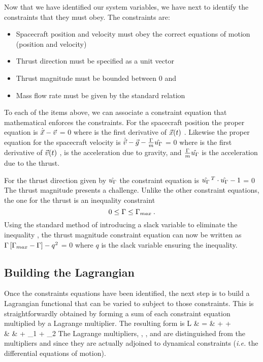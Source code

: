 \documentclass{article}
\newcommand{\scpos}{\ensuremath{\idx{\cv{x}}{(t)}} }
\newcommand{\scvel}{\ensuremath{\idx{\cv{v}}{(t)}} }
\newcommand{\tvec} {\ensuremath{\cuv{\idx{u}{\dn{\gG}}}} }
\newcommand{\tvect}{\ensuremath{\ruv{\idx{u}{\dn{\gG}}}} }
\newcommand{\lx} {\idx{\cv{\gl}}{\dn{x}} }
\newcommand{\lxt}{\idx{\cv{\gl}}{\dn{x}\up{T}} }
\newcommand{\lv} {\idx{\cv{\gl}}{\dn{v}} }
\newcommand{\lvt}{\idx{\cv{\gl}}{\dn{v}\up{T}} }
\newcommand{\lm} {\idx{\gl}{\dn{m}} }
\newcommand{\poseq}{\ensuremath{\dt{\cv{x}} - \cv{v}} }
\newcommand{\veleq}{\ensuremath{\dt{\cv{v}} - \cv{g} -
                                       \frac{\gG}{m}\cuv{\idx{u}{\dn{\gG}}}} }
\newcommand{\meq}{\ensuremath{\dt{m} - \frac{\gG}{c}} }
\newcommand{\veceq}{\ensuremath{\ipd{\tvect}{\tvec} - 1} }
\newcommand{\teq}  {\ensuremath{\gG \surb{\idx{\gG}{\dn{max}} - \gG} - \idx{q}{\up{2}}} }
\begin{document}
Now that we have identified our system variables, we have next to
identify the constraints that they must obey.  The constraints
are:
\begin{itemize}
  \item Spacecraft position and velocity must obey the correct equations of motion
  (position and velocity)
  \item Thrust direction must be specified as a unit vector
  \item Thrust magnitude must be bounded between 0 and
  \item Mass flow rate must be given by the standard relation
\end{itemize}
To each of the items above, we can associate a constraint equation
that mathematical enforces the constraints.  For the spacecraft
position the proper equation is
\be
  \poseq = 0 \eqc
\ee
where  is the first derivative of \scpos.  Likewise
the proper equation for the spacecraft velocity is \be
  \veleq = 0 \eqc
\ee where  is the first derivative of \scvel,  is
the acceleration due to gravity, and $\frac{\gG}{m} \tvec$ is the
acceleration due to the thrust.

For the thrust direction given by \tvec the constraint equation is
\be
  \veceq = 0 \eqp
\ee
The thrust magnitude presents a challenge.  Unlike the other
constraint equations, the one for the thrust is an inequality
constraint
\[
0 \leq \Gamma \leq  {\ensuremath{\Gamma} }{\ensuremath{{}_{max} } }  \: .
\]
Using the standard method of introducing a slack variable to
eliminate the inequality \cite{in}, the thrust magnitude
constraint equation can now be written as
\be
  \teq = 0 \eqc
\ee
where $q$ is the slack variable ensuring the inequality.



\subsection{Building the Lagrangian}
Once the constraints equations have been identified, the next step
is to build a Lagrangian functional that can be varied to subject
to those constraints.  This is straightforwardly obtained by
forming a sum of each constraint equation multiplied by a Lagrange
multiplier.  The resulting form is
\bea\label{eq:def_L}
  L & = &   \ipd{\lxt}{\surp{\poseq}} + \ipd{\lvt}{\surp{\veleq}} + \lm \surp{\meq} \nonumber \\
    &   & + \gs_1 \surp{\veceq} + \gs_2 \surp{\teq} \eqp
\eea The Lagrange multipliers, \lx, \lv, and \lm are distinguished
from the multipliers  and  since
they are actually adjoined to dynamical constraints (\textit{i.e.}
the differential equations of motion).
\end{document}
